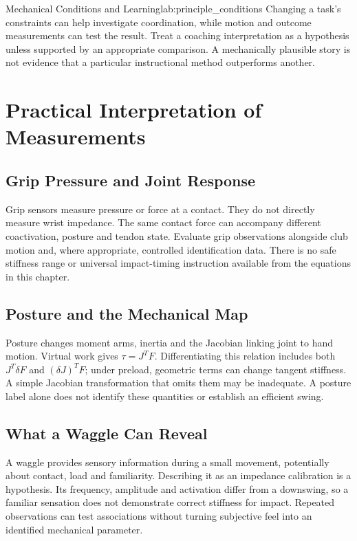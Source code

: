 \begin{principle}{Mechanical Conditions and Learning}{lab:principle_conditions}
Changing a task's constraints can help investigate coordination, while motion and outcome measurements can test the result. Treat a coaching interpretation as a hypothesis unless supported by an appropriate comparison. A mechanically plausible story is not evidence that a particular instructional method outperforms another.
\end{principle}

\section{Practical Interpretation of Measurements}
\label{sec:practical}

\subsection{Grip Pressure and Joint Response}
\label{subsec:grip_pressure}

Grip sensors measure pressure or force at a contact. They do not directly measure wrist impedance. The same contact force can accompany different coactivation, posture and tendon state. Evaluate grip observations alongside club motion and, where appropriate, controlled identification data. There is no safe stiffness range or universal impact-timing instruction available from the equations in this chapter.

\subsection{Posture and the Mechanical Map}
\label{subsec:address}

Posture changes moment arms, inertia and the Jacobian linking joint to hand motion. Virtual work gives $\tau=J^TF$. Differentiating this relation includes both $J^T\delta F$ and $(\delta J)^TF$; under preload, geometric terms can change tangent stiffness. A simple Jacobian transformation that omits them may be inadequate. A posture label alone does not identify these quantities or establish an efficient swing.

\subsection{What a Waggle Can Reveal}
\label{subsec:waggle}

A waggle provides sensory information during a small movement, potentially about contact, load and familiarity. Describing it as an impedance calibration is a hypothesis. Its frequency, amplitude and activation differ from a downswing, so a familiar sensation does not demonstrate correct stiffness for impact. Repeated observations can test associations without turning subjective feel into an identified mechanical parameter.

